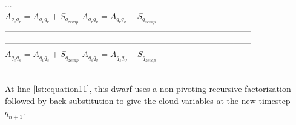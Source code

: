 \documentclass[
a4paper,     %
12pt,        %
article,
onecolumn,   %
openany,     %
]{memoir}
\begin{document}
%
\begin{algorithm}[H]
\begin{algorithmic}
\vspace{.2cm}
\State ...
\vspace{.2cm}
\Indent
\vspace{-.2cm}
\State ---------------------------------------------------------------------------------------
\vspace{-.2cm}
\State $A_{q_v q_r} = A_{q_v q_r} + S_{q_{zevap}}$
\State $A_{q_r q_v} = A_{q_r q_v} - S_{q_{zevap}}$
\vspace{-.2cm}
\State ---------------------------------------------------------------------------------------
\vspace{.4cm}
\EndIndent
{}
\Indent
\vspace{-.2cm}
\State ---------------------------------------------------------------------------------------
\vspace{-.2cm}
\State $A_{q_v q_s} = A_{q_v q_s} + S_{q_{zevap}}$
\State $A_{q_s q_v} = A_{q_s q_v} - S_{q_{zevap}}$
\vspace{-.2cm}
\State ---------------------------------------------------------------------------------------
\vspace{.4cm}
\EndIndent
\end{algorithmic}
\end{algorithm}
%


At line \ref{lst:equation11}, this dwarf uses a non-pivoting recursive factorization 
followed by back substitution to give the cloud variables at the new timestep 
$q_{n+1}$.




\newpage
\end{document}
